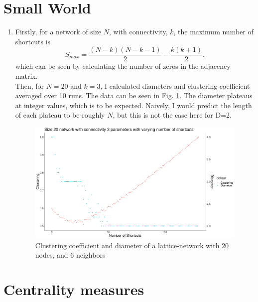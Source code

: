 \documentclass[a4paper]{article}
\begin{document}
\pagebreak

\section{Small World}

\begin{enumerate}[label={(5. \alph*)}]
    \item 
        Firstly, for a network of size $N$, with connectivity, $k$, the maximum number of shortcuts is   
        \[
            S_{max} = \frac{(N - k)(N - k - 1)}{2} - \frac{k(k+1)}{2}
        .\] 
        which can be seen by calculating the number of zeros in the adjacency matrix. \\ Then, for $N = 20$ and $k=3$, I calculated diameters and clustering coefficient averaged over 10 runs. The data can be seen in Fig. \ref{fig:small_world}. The diameter plateaus at integer values, which is to be expected. Naively, I would predict the length of each plateau to be roughly $N$, but this is not the case here for D=2. 
    
    \begin{figure}[h]
        \centerline{\includegraphics[width=1.3\linewidth]{./small_world.png}}
        \caption{Clustering coefficient and diameter of a lattice-network with 20 nodes, and 6 neighbors}
        \label{fig:small_world}
    \end{figure}
\end{enumerate}

\pagebreak

\section{Centrality measures}
\end{document}
